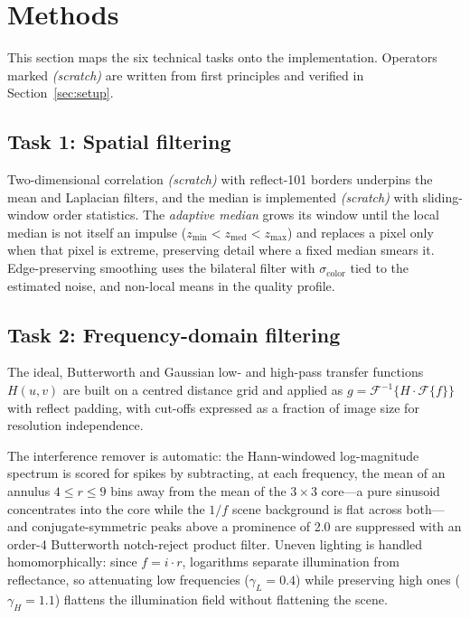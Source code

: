 \documentclass[conference,10pt]{IEEEtran}
\begin{document}
\section{Methods}\label{sec:methods}
This section maps the six technical tasks onto the implementation.
Operators marked \emph{(scratch)} are written from first principles and
verified in Section~\ref{sec:setup}.

\subsection{Task 1: Spatial filtering}
Two-dimensional correlation \emph{(scratch)} with reflect-101 borders
underpins the mean and Laplacian filters, and the median is implemented
\emph{(scratch)} with sliding-window order statistics. The \emph{adaptive
median} \cite{gonzalez2018} grows its window until the local median is not
itself an impulse ($z_{\min} < z_{\mathrm{med}} < z_{\max}$) and replaces a
pixel only when that pixel is extreme, preserving detail where a fixed median
smears it. Edge-preserving smoothing uses the bilateral filter
\cite{tomasi1998bilateral} with $\sigma_{\mathrm{color}}$ tied to the estimated
noise, and non-local means \cite{buades2005nlm} in the quality profile.

\subsection{Task 2: Frequency-domain filtering}
The ideal, Butterworth and Gaussian low- and high-pass transfer functions
$H(u,v)$ are built on a centred distance grid and applied as
$g=\mathcal{F}^{-1}\{H\cdot\mathcal{F}\{f\}\}$ with reflect padding, with
cut-offs expressed as a fraction of image size for resolution independence.

The interference remover is automatic: the Hann-windowed log-magnitude spectrum
is scored for spikes by subtracting, at each frequency, the mean of an annulus
$4 \le r \le 9$ bins away from the mean of the $3\times3$ core---a pure
sinusoid concentrates into the core while the $1/f$ scene background is flat
across both---and conjugate-symmetric peaks above a prominence of 2.0 are
suppressed with an order-4 Butterworth notch-reject product filter. Uneven
lighting is handled homomorphically: since $f = i\cdot r$, logarithms separate
illumination from reflectance, so attenuating low frequencies
($\gamma_L{=}0.4$) while preserving high ones ($\gamma_H{=}1.1$) flattens the
illumination field without flattening the scene.
\end{document}
